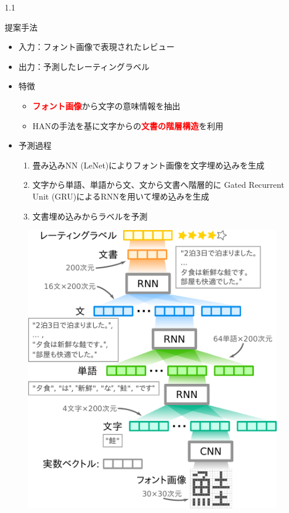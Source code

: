 \documentclass[unicode,10pt]{beamer}
\newlength{\mycolumnwidth}
\newcommand{\fire}[1]{\textcolor{red}{\textbf{#1}}}
\begin{document}
\begin{frame}[t]
\begin{columns}[onlytextwidth,t]
  \begin{column}{1.1\mycolumnwidth}
    \begin{block}{提案手法}
      \begin{itemize}
        \item 入力：フォント画像で表現されたレビュー
        \item 出力：予測したレーティングラベル
        \item 特徴
          \begin{itemize}
            \item \fire{フォント画像}から文字の意味情報を抽出
            \item HAN\cite{yang16}の手法を基に文字からの\fire{文書の階層構造}を利用
          \end{itemize}
        \item 予測過程
          \begin{enumerate}
            \item 畳み込みNN (LeNet)によりフォント画像を文字埋め込みを生成
            \item 文字から単語、単語から文、文から文書へ階層的に
                  Gated Recurrent Unit (GRU)によるRNNを用いて埋め込みを生成
            \item 文書埋め込みからラベルを予測
          \end{enumerate}
      \end{itemize}
      \begin{figure}
        \includegraphics[width=0.85\linewidth]{fig/fcwsd.pdf}

\end{figure}
\end{block}
\end{column}
\end{columns}
\end{frame}
\end{document}
